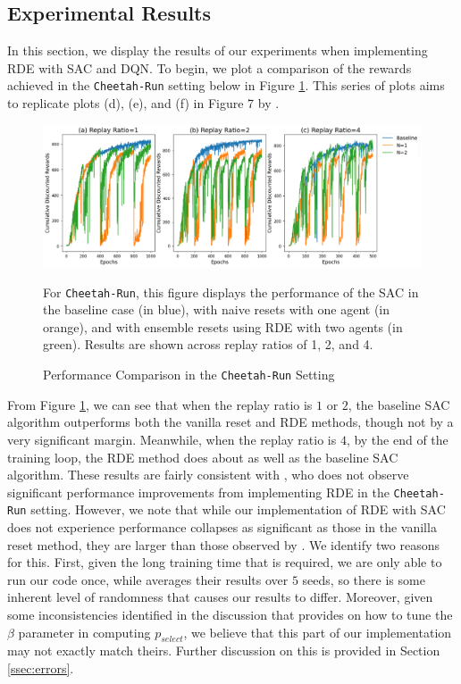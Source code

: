 \documentclass[base]{subfiles}
\begin{document}
\subsection{Experimental Results}
\label{ssec:experiments}

In this section, we display the results of our experiments when implementing RDE with SAC and DQN.
To begin, we plot a comparison of the rewards achieved in the \texttt{Cheetah-Run} setting below in Figure \ref{fig:cheetah}. This series of plots aims to replicate plots (d), (e), and (f) in Figure 7 by \cite{kim2023}.

\begin{figure}[h!]
	\centering
	\caption{Performance Comparison in the \texttt{Cheetah-Run} Setting}
	\label{fig:cheetah}
	\includegraphics[width = 1 \linewidth]{cheetah_fig.png}
	\begin{flushleft} For \texttt{Cheetah-Run}, this figure displays the performance of the SAC in the baseline case (in blue), with naive resets with one agent (in orange), and with ensemble resets using RDE with two agents (in green). Results are shown across replay ratios of 1, 2, and 4. \end{flushleft}
\end{figure}

From Figure \ref{fig:cheetah}, we can see that when the replay ratio is $1$ or $2$, the baseline SAC algorithm outperforms both the vanilla reset and RDE methods, though not by a very significant margin.
Meanwhile, when the replay ratio is $4$, by the end of the training loop, the RDE method does about as well as the baseline SAC algorithm.
These results are fairly consistent with \cite{kim2023}, who does not observe significant performance improvements from implementing RDE in the \texttt{Cheetah-Run} setting.
However, we note that while our implementation of RDE with SAC does not experience performance collapses as significant as those in the vanilla reset method, they are larger than those observed by \cite{kim2023}.
We identify two reasons for this.
First, given the long training time that is required, we are only able to run our code once, while \cite{kim2023} averages their results over $5$ seeds, so there is some inherent level of randomness that causes our results to differ.
Moreover, given some inconsistencies identified in the discussion that \cite{kim2023} provides on how to tune the $\beta$ parameter in computing $p_{select}$, we believe that this part of our implementation may not exactly match theirs.
Further discussion on this is provided in Section \ref{ssec:errors}.
\end{document}

